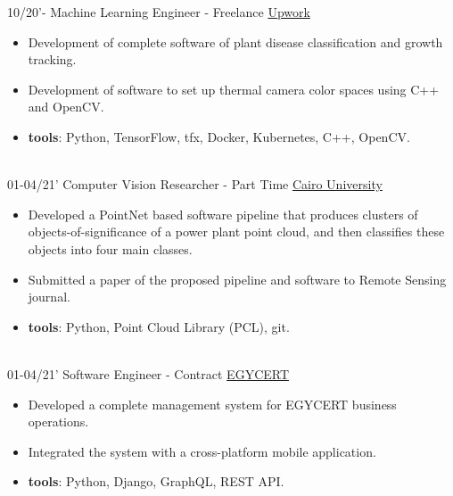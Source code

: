 \documentclass[a4paper]{twentysecondcv} %
\begin{document}
\begin{twenty} %




 \twentyitem
  {10/20'-}
{}
    {Machine Learning Engineer - Freelance}
    {\href{https://www.upwork.com/freelancers/~01ec81ec5f74cf3ea8}{Upwork}}
    {}
    {\vspace{-2mm}\begin{itemize}[topsep=0pt,partopsep=0pt]
    \item Development of complete software of plant disease classification and growth tracking.
    \item Development of software to set up thermal camera color spaces using C++ and OpenCV.
    \item \textbf{tools}: Python, TensorFlow, tfx, Docker, Kubernetes, C++, OpenCV.
    \end{itemize}} \\

  \twentyitem
  {01-04/21'}
{}
    {Computer Vision Researcher - Part Time}
    {\href{http://eng.cu.edu.eg/en/}{Cairo University}}
    {}
    {\vspace{-2mm}\begin{itemize}[topsep=0pt,partopsep=0pt]
    \item Developed a PointNet based software pipeline that produces clusters of objects-of-significance of a power plant point cloud, and then classifies these objects into four main classes.
    \item Submitted a paper of the proposed pipeline and software to Remote Sensing journal.
    \item \textbf{tools}: Python, Point Cloud Library (PCL), git.
    \end{itemize}} \\


    \twentyitem
  {01-04/21'}
{}
    {Software Engineer - Contract}
    {\href{https://egy-cert.com/}{EGYCERT}}
    {}
    {\vspace{-2mm}\begin{itemize}[topsep=0pt,partopsep=0pt]
    \item Developed a complete management system for EGYCERT business operations.
    \item Integrated the system with a cross-platform mobile application.
    \item \textbf{tools}: Python, Django, GraphQL, REST API.
    \end{itemize}} \\


\end{twenty}
\end{document}
